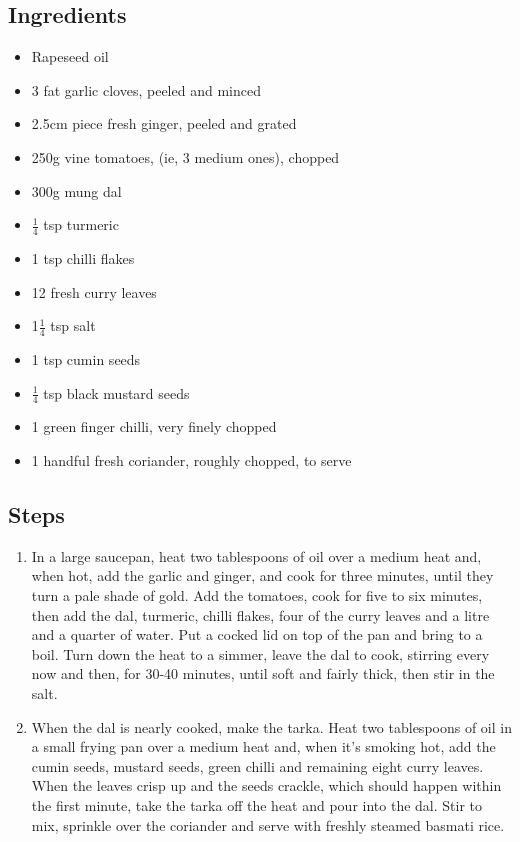 \documentclass{book}
\begin{document}
\subsection*{Ingredients}
\begin{itemize}
\item Rapeseed oil
\item 3 fat garlic cloves, peeled and minced
\item 2.5cm piece fresh ginger, peeled and grated
\item 250g vine tomatoes, (ie, 3 medium ones), chopped
\item 300g mung dal
\item $\frac{1}{4}$ tsp turmeric
\item 1 tsp chilli flakes
\item 12 fresh curry leaves
\item 1$\frac{1}{4}$ tsp salt
\item 1 tsp cumin seeds
\item $\frac{1}{4}$ tsp black mustard seeds
\item 1 green finger chilli, very finely chopped
\item 1 handful fresh coriander, roughly chopped, to serve
\end{itemize}

\subsection*{Steps}
\begin{enumerate}
\item In a large saucepan, heat two tablespoons of oil over a medium heat and, when hot, add the garlic and ginger, and cook for three minutes, until they turn a pale shade of gold. Add the tomatoes, cook for five to six minutes, then add the dal, turmeric, chilli flakes, four of the curry leaves and a litre and a quarter of water. Put a cocked lid on top of the pan and bring to a boil. Turn down the heat to a simmer, leave the dal to cook, stirring every now and then, for 30-40 minutes, until soft and fairly thick, then stir in the salt.
\item When the dal is nearly cooked, make the tarka. Heat two tablespoons of oil in a small frying pan over a medium heat and, when it’s smoking hot, add the cumin seeds, mustard seeds, green chilli and remaining eight curry leaves. When the leaves crisp up and the seeds crackle, which should happen within the first minute, take the tarka off the heat and pour into the dal. Stir to mix, sprinkle over the coriander and serve with freshly steamed basmati rice.
\end{enumerate}
\newpage
\end{document}
